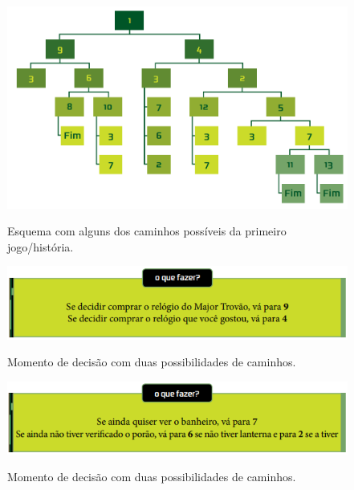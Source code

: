 \begin{figure}
    \centering
    \caption{Esquema com alguns dos caminhos possíveis da primeiro jogo/história.}
    \includegraphics[scale=0.3]{Textuais/Pictures/Picture1.png}
    \label{fig:figure-1}
\end{figure}
\begin{figure}
    \centering
    \caption{Momento de decisão com duas possibilidades de caminhos.}
    \includegraphics[scale=1]{Textuais/Pictures/Picture2.png}
    \label{fig:figure-2}
\end{figure}
\begin{figure}
    \centering
    \caption{Momento de decisão com duas possibilidades de caminhos.}
    \includegraphics[scale=1]{Textuais/Pictures/Picture3.png}
    \label{fig:figure-3}
\end{figure}